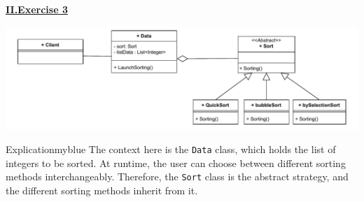 \newpage
\begin{center}
    \Huge{\textbf{\underline{II.Exercise 3}}}
\end{center}

\vspace{0.45cm}

\begin{center}
    \includegraphics[height=0.18\textheight]{Exercices/2.EX3/ex3.drawio.pdf}
\end{center}

\vspace{0.25cm}

\begin{prettyBox}{Explication}{myblue}
The context here is the \texttt{Data} class, which holds the list of integers to be sorted. 
At runtime, the user can choose between different sorting methods interchangeably. 
Therefore, the \texttt{Sort} class is the abstract strategy, and the different sorting methods 
inherit from it.
\end{prettyBox}

